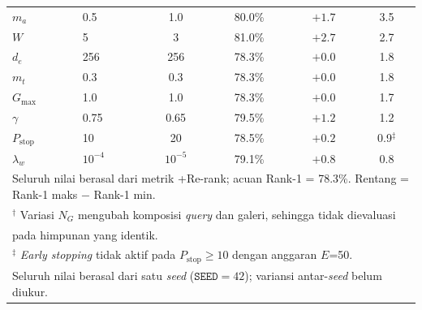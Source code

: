 \begin{table}[htbp]
\begin{tabular}{llcccc}
        $m_a$                & 0{.}5          & 1{.}0                  & 80.0\%                  & $+1{.}7$                 & 3{.}5                      \\
        $W$                  & 5              & 3                      & 81.0\%                  & $+2{.}7$                 & 2{.}7                      \\
        $d_e$                & 256            & 256                    & 78.3\%                  & $+0{.}0$                 & 1{.}8                      \\
        $m_t$                & 0{.}3          & 0{.}3                  & 78.3\%                  & $+0{.}0$                 & 1{.}8                      \\
        $G_{\max}$           & 1{.}0          & 1{.}0                  & 78.3\%                  & $+0{.}0$                 & 1{.}7                      \\
        $\gamma$             & 0{.}75         & 0{.}65                 & 79.5\%                  & $+1{.}2$                 & 1{.}2                      \\
        $P_{\text{stop}}$    & 10             & 20                     & 78.5\%                  & $+0{.}2$                 & 0{.}9$^{\ddagger}$         \\
        $\lambda_w$          & $10^{-4}$      & $10^{-5}$              & 79.1\%                  & $+0{.}8$                 & 0{.}8                      \\
        \hline
        \multicolumn{6}{l}{\footnotesize Seluruh nilai berasal dari metrik +Re-rank; acuan Rank-1 = 78.3\%. Rentang = Rank-1 maks $-$ Rank-1 min.}       \\
        \multicolumn{6}{l}{\footnotesize $^{\dagger}$ Variasi $N_G$ mengubah komposisi \textit{query} dan galeri, sehingga tidak dievaluasi}             \\
        \multicolumn{6}{l}{\footnotesize \phantom{$^{\dagger}$} pada himpunan yang identik.}                                                             \\
        \multicolumn{6}{l}{\footnotesize $^{\ddagger}$ \textit{Early stopping} tidak aktif pada $P_{\text{stop}} \geq 10$ dengan anggaran $E$=50.}       \\
        \multicolumn{6}{l}{\footnotesize Seluruh nilai berasal dari satu \textit{seed} ($\texttt{SEED}=42$); variansi antar-\textit{seed} belum diukur.} \\
    \end{tabular}
\end{table}


